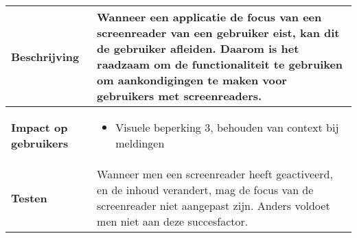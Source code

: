 \begin{table}[H]
\begin{tabular}{|l|p{12cm}|}
        \hline
        \textbf{Beschrijving}                 & Wanneer een applicatie de focus van een screenreader van een gebruiker eist, kan dit de gebruiker afleiden. Daarom is het raadzaam om de functionaliteit te gebruiken om aankondigingen te maken voor gebruikers met screenreaders.   \\ 
        \hline
        \textbf{Impact op gebruikers}         &  
        \begin{itemize}
            \item Visuele beperking 3, behouden van context bij meldingen
        \end{itemize}                                                                                                                                                                                                                                                                                                     \\ 
        
        \hline
        \textbf{Testen}                       & Wanneer men een screenreader heeft geactiveerd, en de inhoud verandert, mag de focus van de screenreader niet aangepast zijn. Anders voldoet men niet aan deze succesfactor.              \\
        \hline
    \end{tabular}
    
\end{table}

